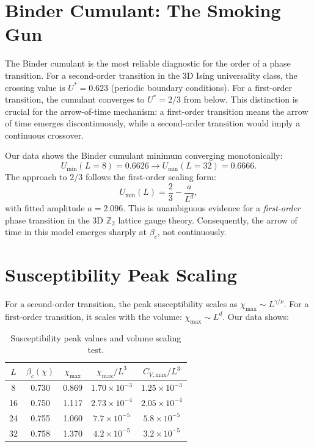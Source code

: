 \documentclass{article}
\begin{document}
\section{Binder Cumulant: The Smoking Gun}

The Binder cumulant is the most reliable diagnostic for the order of a phase transition. For a second-order transition in the 3D Ising universality class, the crossing value is $U^* = 0.623$ (periodic boundary conditions). For a first-order transition, the cumulant converges to $U^* = 2/3$ from below. This distinction is crucial for the arrow-of-time mechanism: a first-order transition means the arrow of time emerges discontinuously, while a second-order transition would imply a continuous crossover.

Our data shows the Binder cumulant minimum converging monotonically:
%
\begin{equation}
U_\text{min}(L=8) = 0.6626 \to U_\text{min}(L=32) = 0.6666.
\end{equation}
%
The approach to $2/3$ follows the first-order scaling form:
%
\begin{equation}
U_\text{min}(L) = \frac{2}{3} - \frac{a}{L^d},
\end{equation}
%
with fitted amplitude $a = 2.096$. This is unambiguous evidence for a \emph{first-order} phase transition in the 3D $\mathbb{Z}_2$ lattice gauge theory. Consequently, the arrow of time in this model emerges sharply at $\beta_c$, not continuously.

\section{Susceptibility Peak Scaling}

For a second-order transition, the peak susceptibility scales as $\chi_\text{max} \sim L^{\gamma/\nu}$. For a first-order transition, it scales with the volume: $\chi_\text{max} \sim L^d$. Our data shows:

\begin{table}[htbp]
\centering
\caption{Susceptibility peak values and volume scaling test.}
\label{tab:t20d-chi-scaling}
\begin{tabular}{@{}ccccc@{}}
\toprule
$L$ & $\beta_c(\chi)$ & $\chi_\text{max}$ & $\chi_\text{max}/L^3$ & $C_{V,\text{max}}/L^3$ \\
\midrule
8  & 0.730 & 0.869 & $1.70 \times 10^{-3}$ & $1.25 \times 10^{-3}$ \\
16 & 0.750 & 1.117 & $2.73 \times 10^{-4}$ & $2.05 \times 10^{-4}$ \\
24 & 0.755 & 1.060 & $7.7 \times 10^{-5}$  & $5.8 \times 10^{-5}$ \\
32 & 0.758 & 1.370 & $4.2 \times 10^{-5}$  & $3.2 \times 10^{-5}$ \\
\bottomrule
\end{tabular}
\end{table}
\end{document}

